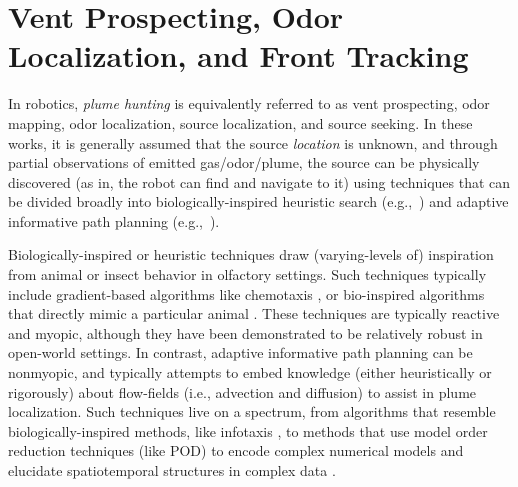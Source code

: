 \section{Vent Prospecting, Odor Localization, and Front Tracking}
\label{sec:rw_planning}
In robotics, \emph{plume hunting} is equivalently referred to as vent prospecting, odor mapping, odor localization, source localization, and source seeking. In these works, it is generally assumed that the source \emph{location} is unknown, and through partial observations of emitted gas/odor/plume, the source can be physically discovered (as in, the robot can find and navigate to it) using techniques that can be divided broadly into biologically-inspired heuristic search (e.g.,~\cite{reddy2022olfactory,chen2019odor}) and adaptive informative path planning (e.g.,~\cite{salam2019adaptive, jakuba2007stochastic}).

Biologically-inspired or heuristic techniques draw (varying-levels of) inspiration from animal or insect behavior in olfactory settings. Such techniques typically include gradient-based algorithms like chemotaxis \autocite{morse1998robust}, or bio-inspired algorithms that directly mimic a particular animal \autocite{edwards2001representing,grasso2000biomimetic}. These techniques are typically reactive and myopic, although they have been demonstrated to be relatively robust in open-world settings. In contrast, adaptive informative path planning can be nonmyopic, and typically attempts to embed knowledge (either heuristically or rigorously) about flow-fields (i.e., advection and diffusion) to assist in plume localization. Such techniques live on a spectrum, from algorithms that resemble biologically-inspired methods, like infotaxis \autocite{vergassola2007infotaxis}, to methods that use model order reduction techniques (like POD) to encode complex numerical models and elucidate spatiotemporal structures in complex data \autocite{peng2014dynamic,salam2019adaptive}. 

